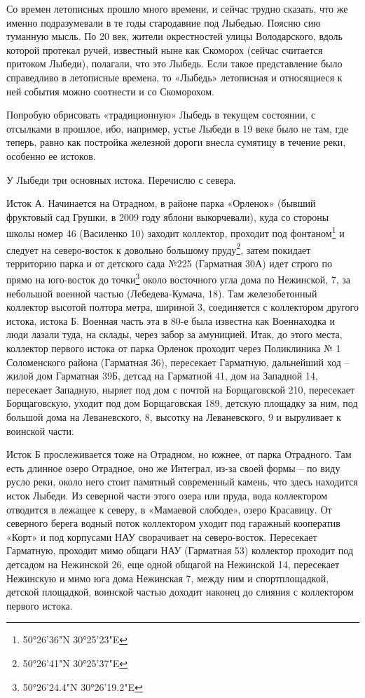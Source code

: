 Со времен летописных прошло много времени, и сейчас трудно сказать, что же именно подразумевали в те годы стародавние под Лыбедью. Поясню сию туманную мысль. По 20 век, жители окрестностей улицы Володарского, вдоль которой протекал ручей, известный ныне как Скоморох (сейчас считается притоком Лыбеди), полагали, что это Лыбедь. Если такое представление было справедливо в летописные времена, то «Лыбедь» летописная и относящиеся к ней события можно соотнести и со Скоморохом.

Попробую обрисовать «традиционную» Лыбедь в текущем состоянии, с отсылками в прошлое, ибо, например, устье Лыбеди в 19 веке было не там, где теперь, равно как постройка железной дороги внесла сумятицу в течение реки, особенно ее истоков.

У Лыбеди три основных истока. Перечислю с севера.

Исток А. Начинается на Отрадном, в районе парка «Орленок» (бывший фруктовый сад Грушки, в 2009 году яблони выкорчевали), куда со стороны школы номер 46 (Василенко 10) заходит коллектор, проходит под фонтаном\footnote{50°26'36"N 30°25'23"E} и следует на северо-восток к довольно большому пруду\footnote{50°26'41"N 30°25'37"E}, затем покидает территорию парка и от детского сада №225 (Гарматная 30А) идет строго по прямо на юго-восток до точки\footnote{50°26'24.4"N 30°26'19.2"E} около восточного угла дома по Нежинской, 7, за небольшой военной частью (Лебедева-Кумача, 18). Там железобетонный коллектор высотой полтора метра, шириной 3, соединяется с коллектором другого истока, истока Б. Военная часть эта в 80-е была известна как Военнаходка и люди лазали туда, на склады, через забор за амуницией. Итак, до этого места, коллектор первого истока от парка Орленок проходит через Поликлиника № 1 Соломенского района (Гарматная 36), пересекает Гарматную, дальнейший ход – жилой дом Гарматная 39Б, детсад на Гарматной 41, дом на Западной 14, пересекает Западную, ныряет под дом с почтой на Борщаговской 210, пересекает Борщаговскую, уходит под дом Борщаговская 189, детскую площадку за ним, под большой дома на Леваневского, 8, высотку на Леваневского, 9 и выруливает к воинской части.  

Исток Б прослеживается тоже на Отрадном, но южнее, от парка Отрадного. Там есть длинное озеро Отрадное, оно же Интеграл, из-за своей формы – по виду русло реки, около него стоит памятный современный камень, что здесь находится исток Лыбеди. Из северной части этого озера или пруда, вода коллектором отводится в лежащее к северу, в «Мамаевой слободе», озеро Красавицу. От северного берега водный поток коллектором уходит под гаражный кооператив «Корт» и под корпусами НАУ сворачивает на северо-восток. Пересекает Гарматную, проходит мимо общаги НАУ (Гарматная 53) коллектор проходит под детсадом на Нежинской 26, еще одной общагой на Нежинской 14, пересекает Нежинскую и мимо юга дома Нежинская 7, между ним и спортплощадкой, детской площадкой, воинской частью доходит наконец до слияния с коллектором первого истока.

